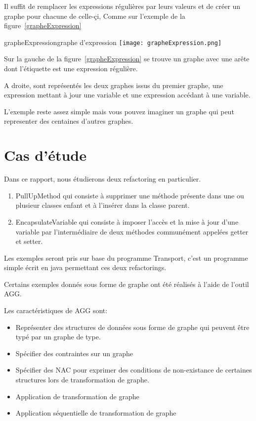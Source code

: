 \documentclass[a4paper, 12pt]{article}
\begin{document}
  Il suffit de remplacer les expressions régulières par leurs valeurs et de créer un graphe pour chacune de celle-çi, Comme sur l'exemple de la figure~\ref{grapheExpression}

  \begin{myfig}{grapheExpression}{graphe d'expression}
    \texttt{[image: grapheExpression.png]}
  \end{myfig}

  Sur la gauche de la figure~\ref{grapheExpression} se trouve un graphe avec une arête dont l'étiquette est une expression régulière.

  A droite, sont représentés les deux graphes issus du premier graphe, une expression mettant à jour une variable et une expression accédant à une variable.

  L'exemple reste assez simple mais vous pouvez imaginer un graphe qui peut representer des centaines d'autres graphes.

  \section{Cas d'étude}

  Dans ce rapport, nous étudierons deux refactoring en particulier.

  \begin{enumerate}
    \item PullUpMethod qui consiste à supprimer une méthode présente dans une ou plusieur classes enfant et à l'insérer dans la classe parent.
    \item EncapsulateVariable qui consiste à imposer l'accès et la mise à jour d'une variable par l'intermédiaire de deux méthodes communément appelées getter et setter.
  \end{enumerate}

  Les exemples seront pris sur base du programme Transport, c'est un programme simple écrit en java permettant ces deux refactorings.

  Certains exemples donnés sous forme de graphe ont été réalisés à l'aide de l'outil AGG.

  Les caractéristiques de AGG sont:

  \begin{itemize}[label=\textbullet]
    \item Représenter des structures de données sous forme de graphe qui peuvent être typé par un graphe de type.
    \item Spécifier des contraintes sur un graphe
    \item Spécifier des NAC pour exprimer des conditions de non-existance de certaines structures lors de transformation de graphe.
    \item Application de transformation de graphe
    \item Application séquentielle de transformation de graphe
  \end{itemize}
\end{document}
